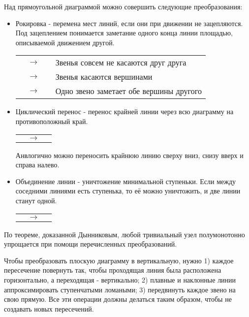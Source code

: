Над прямоугольной диаграммой можно совершить следующие преобразования:
\begin{itemize}
\item Рокировка - перемена мест линий, если они при движении не зацепляются. Под зацеплением понимается заметание одного конца линии площадью, описываемой движением другой.

\begin{tabular}{
>{\centering\arraybackslash}m{3cm}
c
>{\centering\arraybackslash}m{3cm}
l
}

&
$\rightarrow$
&

&
Звенья совсем не касаются друг друга
\\

&
$\rightarrow$
&

&
Звенья касаются вершинами
\\

&
$\rightarrow$
&

&
Одно звено заметает обе вершины другого
\end{tabular}

\item Циклический перенос - перенос крайней линии через всю диаграмму на противоположный край.

\begin{tabular}{
>{\centering\arraybackslash}m{3cm}
c
>{\centering\arraybackslash}m{3cm}
}

&
$\rightarrow$
&

\end{tabular}

Анвлогично можно переносить крайнюю линию сверху вниз, снизу вверх и справа налево.

\item Объединение линии - уничтожение минимальной ступеньки.
Если между соседними линиями есть ступенька, то её можно уничтожить, и две линии станут одной.

\begin{tabular}{
>{\centering\arraybackslash}m{3cm}
c
>{\centering\arraybackslash}m{3cm}
}

&
$\rightarrow$
&

\end{tabular}



\end{itemize}

По теореме, доказанной Дынниковым, любой тривиальный узел полумонотонно упрощается при помощи перечисленных преобразований.

Чтобы преобразовать плоскую диаграмму в вертикальную, нужно 1) каждое пересечение повернуть так, чтобы проходящая линия была расположена горизонтально, а переходящая - вертикально; 2) плавные и наклонные линии аппроксимировать ступенчатыми ломаными; 3) передвинуть каждое звено на свою прямую. Все эти операции должны делаться таким образом, чтобы не создавать новых пересечений.